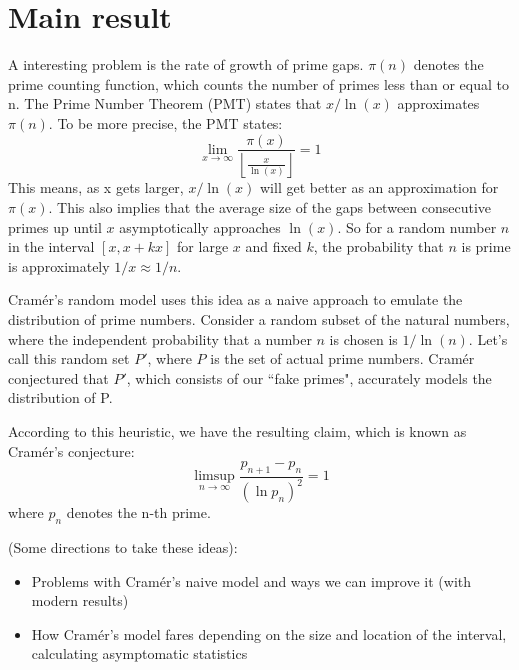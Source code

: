 \documentclass[12pt, letterpaper]{article}
\begin{document}
\section{Main result}
A interesting problem is the rate of growth of prime gaps. $\pi(n)$ denotes the prime counting function, which counts the number of primes less than or equal to n. The Prime Number Theorem (PMT) states that $x / \ln(x)$ approximates $\pi(n)$. To be more precise, the PMT states: \[\lim_{x \to \infty} \frac{\pi(x)}{\left\lfloor \frac{x}{\ln(x)} \right\rfloor} = 1\]
This means, as x gets larger, $x / \ln(x)$ will get better as an approximation for $\pi(x)$. This also implies that the average size of the gaps between consecutive primes up until $x$ asymptotically approaches $\ln(x)$. So for a random number $n$ in the interval $[x, x + kx]$ for large $x$ and fixed $k$, the probability that $n$ is prime is approximately $1 / x \approx 1 / n$.

Cram\'er's random model uses this idea as a naive approach to emulate the distribution of prime numbers. Consider a random subset of the natural numbers, where the independent probability that a number $n$ is chosen is $1 / \ln(n)$. Let's call this random set $P'$, where $P$ is the set of actual prime numbers. Cram\'er conjectured that $P'$, which consists of our ``fake primes", accurately models the distribution of P. 

According to this heuristic, we have the resulting claim, which is known as Cram\'er's conjecture:
\[\limsup_{n \to \infty} \frac{p_{n + 1} - p_n}{(\ln p_n)^2} = 1\]
where $p_n$ denotes the n-th prime.

(Some directions to take these ideas):
\begin{itemize}
  \item Problems with Cram\'er's naive model and ways we can improve it (with modern results)
  \item How Cram\'er's model fares depending on the size and location of the interval, calculating asymptomatic statistics
\end{itemize}
\end{document}
